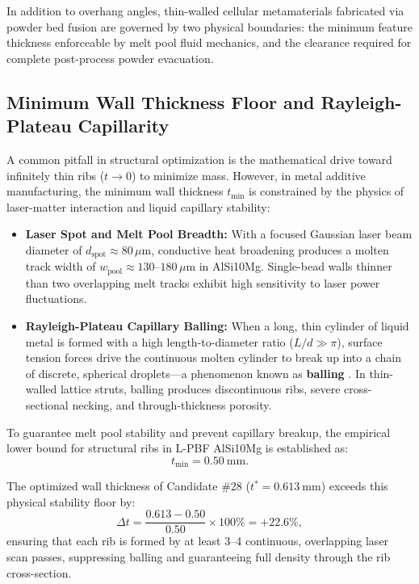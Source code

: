 In addition to overhang angles, thin-walled cellular metamaterials fabricated via powder bed fusion are governed by two physical boundaries: the minimum feature thickness enforceable by melt pool fluid mechanics, and the clearance required for complete post-process powder evacuation.

\subsection{Minimum Wall Thickness Floor and Rayleigh-Plateau Capillarity}
A common pitfall in structural optimization is the mathematical drive toward infinitely thin ribs ($t \to 0$) to minimize mass. However, in metal additive manufacturing, the minimum wall thickness $t_{\text{min}}$ is constrained by the physics of laser-matter interaction and liquid capillary stability:
\begin{itemize}
\item \textbf{Laser Spot and Melt Pool Breadth:} With a focused Gaussian laser beam diameter of $d_{\text{spot}} \approx 80\,\mu\text{m}$, conductive heat broadening produces a molten track width of $w_{\text{pool}} \approx 130\text{--}180\,\mu\text{m}$ in AlSi10Mg. Single-bead walls thinner than two overlapping melt tracks exhibit high sensitivity to laser power fluctuations.
\item \textbf{Rayleigh-Plateau Capillary Balling:} When a long, thin cylinder of liquid metal is formed with a high length-to-diameter ratio ($L/d \gg \pi$), surface tension forces drive the continuous molten cylinder to break up into a chain of discrete, spherical droplets—a phenomenon known as \textbf{balling} \cite{aboulkhair2014}. In thin-walled lattice struts, balling produces discontinuous ribs, severe cross-sectional necking, and through-thickness porosity.
\end{itemize}

To guarantee melt pool stability and prevent capillary breakup, the empirical lower bound for structural ribs in L-PBF AlSi10Mg is established as:
\begin{equation}
t_{\text{min}} = \SI{0.50}{\milli\meter}.
\label{eq:t_min_constraint}
\end{equation}

The optimized wall thickness of Candidate \#28 ($t^* = \SI{0.613}{\milli\meter}$) exceeds this physical stability floor by:
\begin{equation}
\Delta t = \frac{0.613 - 0.50}{0.50} \times 100\% = +22.6\%,
\label{eq:thickness_margin}
\end{equation}
ensuring that each rib is formed by at least 3--4 continuous, overlapping laser scan passes, suppressing balling and guaranteeing full density through the rib cross-section.

